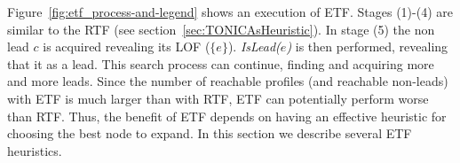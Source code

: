 \documentclass[journal]{IEEEtran}
\newcommand{\islead}[1]{{\em IsLead(#1)}}
\begin{document}
Figure~\ref{fig:etf_process-and-legend} shows an execution of ETF. Stages (1)-(4) are similar to the RTF (see section~\ref{sec:TONICAsHeuristic}). In stage (5) the non lead $c$ is acquired revealing its LOF ($\{e\}$). \islead{$e$} is then performed, revealing that it as a lead. This search process can continue, finding and acquiring more and more leads.
%
%
%
%
%
%
%
Since the number of reachable profiles (and reachable non-leads) with ETF is much larger than with RTF, ETF can potentially perform worse than RTF. Thus, the benefit of ETF depends on having an effective heuristic for choosing the best node to expand. In this section we describe several ETF heuristics.
\end{document}
